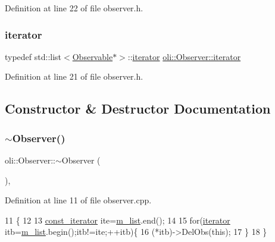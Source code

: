 Definition at line 22 of file observer.\+h.

\hypertarget{classoli_1_1_observer_a845b9aed78746c4f413cdeae346ca1b3}{}\label{classoli_1_1_observer_a845b9aed78746c4f413cdeae346ca1b3} 
\subsubsection{\texorpdfstring{iterator}{iterator}}
{\footnotesize\ttfamily typedef std\+::list$<$\hyperlink{classoli_1_1_observable}{Observable}$\ast$$>$\+::\hyperlink{classoli_1_1_observer_a845b9aed78746c4f413cdeae346ca1b3}{iterator} \hyperlink{classoli_1_1_observer_a845b9aed78746c4f413cdeae346ca1b3}{oli\+::\+Observer\+::iterator}\hspace{0.3cm}{\ttfamily [protected]}}



Definition at line 21 of file observer.\+h.



\subsection{Constructor \& Destructor Documentation}
\hypertarget{classoli_1_1_observer_a204c75941c51c46cf8930361d8948939}{}\label{classoli_1_1_observer_a204c75941c51c46cf8930361d8948939} 
\subsubsection{\texorpdfstring{$\sim$\+Observer()}{~Observer()}}
{\footnotesize\ttfamily oli\+::\+Observer\+::$\sim$\+Observer (\begin{DoxyParamCaption}{ }\end{DoxyParamCaption})\hspace{0.3cm}{\ttfamily [protected]}, {}}



Definition at line 11 of file observer.\+cpp.


\begin{DoxyCode}
11                    \{
12 
13     \hyperlink{classoli_1_1_observer_a1b49363f9c8afdb6734aa28d685579ef}{const\_iterator} ite=\hyperlink{classoli_1_1_observer_acf615598b1c72e779d12c8b9b9422c86}{m\_list}.end();
14 
15     \textcolor{keywordflow}{for}(\hyperlink{classoli_1_1_observer_a845b9aed78746c4f413cdeae346ca1b3}{iterator} itb=\hyperlink{classoli_1_1_observer_acf615598b1c72e779d12c8b9b9422c86}{m\_list}.begin();itb!=ite;++itb)\{
16         (*itb)->DelObs(\textcolor{keyword}{this});
17     \}
18 \}
\end{DoxyCode}


